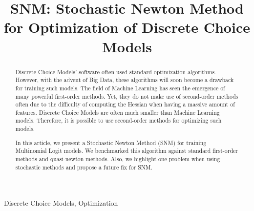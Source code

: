 \documentclass[conference]{IEEEtran}
\begin{document}
\title{SNM: Stochastic Newton Method for Optimization of Discrete Choice Models}

\author{

\and
{}
\and
{}
}

\maketitle

\begin{abstract}
Discrete Choice Models' software often used standard optimization algorithms. However, with the advent of Big Data, these algorithms will soon become a drawback for training such models. The field of Machine Learning has seen the emergence of many powerful first-order methods. Yet, they do not make use of second-order methods often due to the difficulty of computing the Hessian when having a massive amount of features. Discrete Choice Models are often much smaller than Machine Learning models. Therefore, it is possible to use second-order methods for optimizing such models. 

In this article, we present a Stochastic Newton Method (SNM) for training Multinomial Logit models. We benchmarked this algorithm against standard first-order methods and quasi-newton methods. Also, we highlight one problem when using stochastic methods and propose a future fix for SNM.
\end{abstract}

\begin{IEEEkeywords}
Discrete Choice Models, Optimization
\end{IEEEkeywords}
\end{document}
